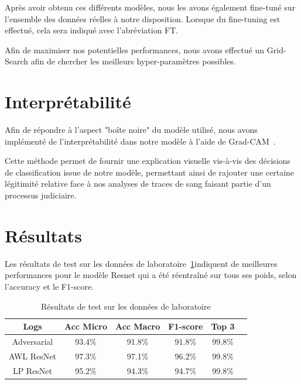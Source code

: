 \documentclass[a4paper]{article}
\begin{document}
Après avoir obtenu ces différents modèles, nous les avons également fine-tuné sur l'ensemble des données réelles à notre disposition. Lorsque du fine-tuning est effectué, cela sera indiqué avec l'abréviation FT. 


Afin de maximiser nos potentielles performances, nous avons effectué un Grid-Search afin de chercher les meilleurs hyper-paramètres possibles. 

\section{Interprétabilité}

Afin de répondre à l'aspect "boîte noire" du modèle utilisé, nous avons implémenté de l'interprétabilité dans notre modèle à l'aide de Grad-CAM~\cite{GRADCAM}. 

Cette méthode permet de fournir une explication visuelle vis-à-vis des décisions de classification issue de notre modèle, permettant ainsi de rajouter une certaine légitimité relative face à nos analyses de traces de sang faisant partie d'un processus judiciaire. 



\section{Résultats}

Les résultats de test sur les données de laboratoire~\ref{tab:results_lab}indiquent de meilleures performances pour le modèle Resnet qui a été réentraîné sur tous ses poids, selon l'accuracy et le F1-score. 

\begin{table}[ht]
  \centering
  \caption{Résultats de test sur les données de laboratoire}
    \begin{tabular}{|c|c|c|c|c|c|}
    \toprule
    Logs & Acc Micro & Acc Macro & F1-score & Top 3 \\
    \midrule
    Adversarial & 93.4\% & 91.8\% & 91.8\% & 99.8\% \\
    AWL ResNet & 97.3\% & 97.1\% & 96.2\% & 99.8\% \\
    LP ResNet & 95.2\% & 94.3\% & 94.7\% & 99.8\% \\
    \bottomrule
    \end{tabular}
  \label{tab:results_lab}
\end{table}
\end{document}
